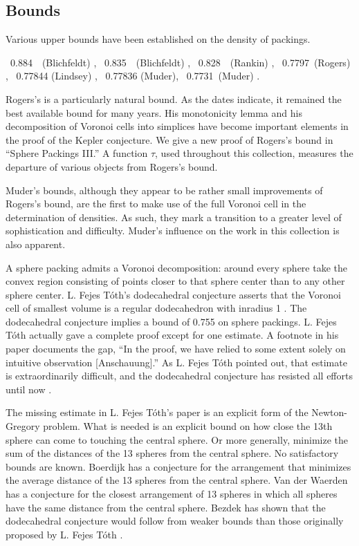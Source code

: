 \subsection{Bounds}

Various upper bounds have been established on the density of
packings.
\smallskip

{\obeylines

 \ 0.884\ \ (Blichfeldt) \cite{Bli19},
 \ 0.835\ \ (Blichfeldt) \cite{Bli29},
 \ 0.828\ \ (Rankin) \cite{Ran47},
 \ 0.7797\ (Rogers) \cite{Rog58},
 \ 0.77844 (Lindsey) \cite{Lin86},
 \ 0.77836 (Muder)\cite{Mud88},
 \ 0.7731\ (Muder) \cite{Mud93}.

}

\smallskip
Rogers's is a particularly natural bound.
  As the dates indicate, it remained the best available
bound for many years.  His monotonicity lemma and his
decomposition of Voronoi cells into simplices have become important
elements in the proof of the Kepler conjecture.
We give a new proof of Rogers's bound
in ``Sphere Packings III.''  A function $\tau$,
used throughout this
collection, measures the departure of various objects from
Rogers's bound.

Muder's bounds, although they appear to be rather small
improvements of Rogers's bound, are the first to make use of the
full Voronoi cell in the determination of densities. As such, they
mark a transition to a greater level of sophistication and
difficulty.  Muder's influence on the work in this collection is
also apparent.

A sphere packing admits a Voronoi decomposition: around
every sphere take the convex region consisting of points closer to that sphere
center than to any other sphere center.   L. Fejes T\'oth's
dodecahedral
conjecture asserts that the Voronoi cell of smallest volume is
a regular dodecahedron with inradius 1 \cite{Fej42}.
The dodecahedral conjecture implies a bound of 0.755 on sphere
packings.  L. Fejes T\'oth actually gave a complete proof except
for one estimate. A footnote in his paper documents the gap, ``In the
proof, we have relied to some extent solely on intuitive
observation [Anschauung].''
 As L. Fejes T\'oth pointed out, that estimate is extraordinarily
difficult, and the dodecahedral conjecture has resisted all efforts
until now \cite{McL98}.

The missing estimate in L. Fejes T\'oth's paper is an explicit form
of the Newton-Gregory problem.  What is needed is an explicit bound
on how close the 13th sphere can come to touching the central
sphere.  Or more generally, minimize the sum of the distances
of the 13 spheres from the central sphere.
No satisfactory bounds are known.  Boerdijk has a conjecture for the arrangement
that minimizes the average distance of the 13 spheres from the
central sphere.   Van der Waerden
has a conjecture for the closest arrangement of 13 spheres in which
all spheres have the same distance from the central sphere.
Bezdek has shown that the dodecahedral conjecture would follow from
weaker bounds than those originally proposed by L. Fejes T\'oth
\cite{Bez97}.

